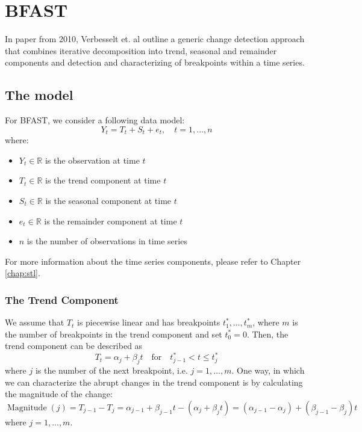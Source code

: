 \documentclass[main.tex]{subfiles}
\begin{document}
\chapter{BFAST}
\label{chap:bfast}
In paper from 2010\cite{bfast}, Verbesselt et. al outline a generic change detection approach
that combines iterative decomposition into trend, seasonal and remainder components and detection
and characterizing of breakpoints within a time series. 

\section{The model}
\label{sec:bfast_the_model}
For BFAST, we consider a following data model:
\[
Y_t = T_t + S_t + e_t, \quad t = 1,...,n
\]
where:
\begin{itemize}
\item $Y_t \in \mathbb{R}$ is the observation at time $t$
\item $T_t \in \mathbb{R}$ is the trend component at time $t$
\item $S_t \in \mathbb{R}$ is the seasonal component at time $t$
\item $e_t \in \mathbb{R}$ is the remainder component at time $t$
\item $n$ is the number of observations in time series
\end{itemize}
For more information about the time series components, please refer to Chapter
\ref{chap:stl}.
\subsection{The Trend Component}
\label{subsec:trend}
We assume that $T_t$ is piecewise linear and has breakpoints $t_1^*,\hdots, t_m^*$,
where $m$ is the number of breakpoints in the trend component and set $t_0^* = 0$.
Then, the trend component can be described as
\[
T_t = \alpha_j + \beta_j t \quad \text{for}\quad t^*_{j-1}<t\leq t_j^*
\]
where $j$ is the number of the next breakpoint, i.e. $j = 1,...,m$. One way, in
which we can characterize the abrupt changes in the trend component is by
calculating the magnitude of the change:
\[
\operatorname{Magnitude}(j) = T_{j-1} - T_{j} = \alpha_{j-1} + \beta_{j-1} t -
(\alpha_j + \beta_j t) = (\alpha_{j-1} - \alpha_j) + (\beta_{j-1} - \beta_j)t
\]
where $j = 1,...,m$.
\end{document}
